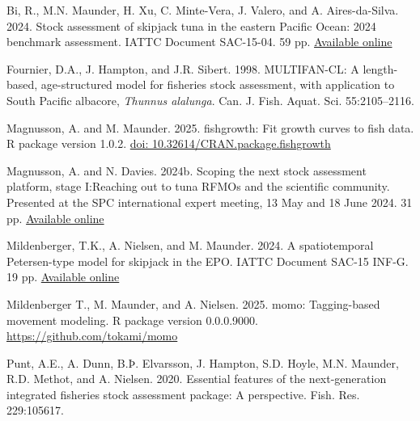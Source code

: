 \documentclass{SCreport}
\newcommand\blob
{https://github.com/PacificCommunity/ofp-sam-transition-plan/blob/main}
\newcommand\present{\blob/presentations}
\begin{document}
\sloppy\setlength{}

\begin{description}\setlength\itemsep{0ex}
  \item Bi, R., M.N. Maunder, H. Xu, C. Minte-Vera, J. Valero, and A.
  Aires-da-Silva. 2024. Stock assessment of skipjack tuna in the eastern Pacific
  Ocean: 2024 benchmark assessment. IATTC Document SAC-15-04. 59 pp.
  \href{https://www.iattc.org/GetAttachment/f57dece1-81ba-4771-8fa8-3362320a368%
    a/SAC-15-04_Skipjack-tuna-benchmark-assessment-2024.pdf}{Available online}
  \item Fournier, D.A., J. Hampton, and J.R. Sibert. 1998. MULTIFAN-CL: A
  length-based, age-structured model for fisheries stock assessment, with
  application to South Pacific albacore, \textit{Thunnus alalunga}. Can. J.
  Fish. Aquat. Sci. 55:2105--2116.
  \item Magnusson, A. and M. Maunder. 2025. fishgrowth: Fit growth curves to
  fish data. R package version 1.0.2.
  \href{https://doi.org/10.32614/CRAN.package.fishgrowth}
  {doi: 10.32614/CRAN.package.fishgrowth}
  \item Magnusson, A. and N. Davies. 2024b. Scoping the next stock assessment
  platform, stage I:\linebreak Reaching out to tuna RFMOs and the scientific
  community. Presented at the SPC international expert meeting, 13 May and 18
  June 2024. 31 pp.
  \href{\present/2024_05_13_experts_scoping/2024_05_13_experts_scoping.pdf}
  {Available online}
  \item Mildenberger, T.K., A. Nielsen, and M. Maunder. 2024. A spatiotemporal
  Petersen-type model for skipjack in the EPO. IATTC Document SAC-15 INF-G. 19
  pp. \href{https://www.iattc.org/GetAttachment/f8eacbc8-92b8-434d-a331-bdc733d%
    c1bc6/SAC-15-INF-G_Spatiotemporal-tagging-model-for-skipjack-in-the-EPO.pdf}
  {Available online}
  \item Mildenberger T., M. Maunder, and A. Nielsen. 2025. momo: Tagging-based
  movement modeling. R package version 0.0.0.9000.
  \href{https://github.com/tokami/momo}{https://github.com/tokami/momo}
  \item Punt, A.E., A. Dunn, B.Þ. Elvarsson, J. Hampton, S.D. Hoyle, M.N.
  Maunder, R.D. Methot, and A. Nielsen. 2020. Essential features of the
  next-generation integrated fisheries stock assessment package: A perspective.
  Fish. Res. 229:105617.
\end{description}

\newpage
\end{document}
